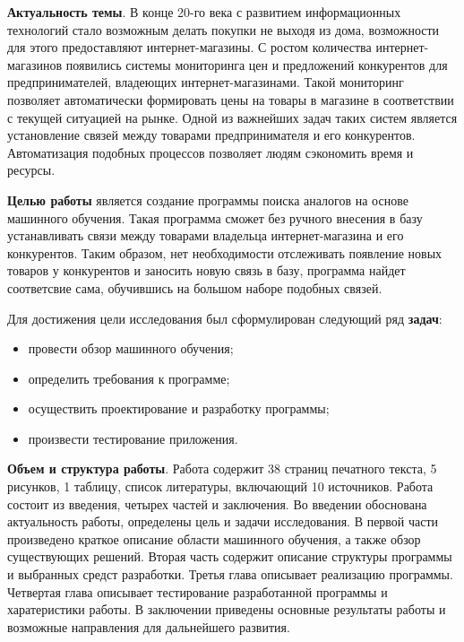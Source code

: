 
\textbf{Актуальность темы}. В конце 20-го века с развитием информационных технологий стало возможным делать покупки не выходя из дома, возможности для этого предоставляют интернет-магазины. С ростом количества интернет-магазинов появились системы мониторинга цен и предложений конкурентов для предпринимателей, владеющих интернет-магазинами. Такой мониторинг позволяет автоматически формировать
цены на товары в магазине в соответствии с текущей ситуацией на рынке. Одной из важнейших задач таких систем является установление связей между товарами предпринимателя и его конкурентов. Автоматизация подобных процессов позволяет людям сэкономить время и ресурсы. 

\textbf{Целью работы} является создание программы поиска аналогов на основе машинного обучения. Такая программа сможет без ручного внесения в базу устанавливать связи между товарами владельца интернет-магазина и его конкурентов. Таким образом, нет необходимости отслеживать появление новых товаров у конкурентов и заносить новую связь в базу, программа найдет соответсвие сама, обучившись на большом наборе подобных связей.

Для достижения цели исследования был сформулирован следующий ряд \textbf{задач}:

\begin{itemize}
  \item провести обзор машинного обучения;
  \item определить требования к программе;
  \item осуществить проектирование и разработку программы;
  \item произвести тестирование приложения.
\end{itemize}

\textbf{Объем и структура работы}. Работа содержит 38 страниц печатного текста, 5 рисунков, 1 таблицу, список литературы, включающий 10 источников. Работа состоит из введения, четырех частей и заключения. Во введении обоснована актуальность работы, определены цель и задачи исследования. В первой части произведено краткое описание области машинного обучения, а также обзор существующих решений. Вторая часть содержит описание структуры программы и выбранных средст разработки. Третья глава описывает реализацию программы. Четвертая глава описывает тестирование разработанной программы и харатеристики работы. В заключении приведены основные результаты работы и возможные направления для дальнейшего развития.

\newpage
